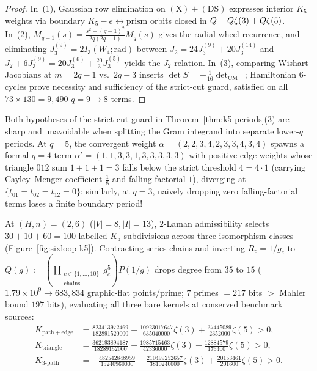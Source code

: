 \begin{proof}
In~(1), Gaussian row elimination on $(\mathrm{X})+(\mathrm{DS})$ expresses interior $K_5$ weights via boundary $K_5-e \leftrightarrow \mathrm{prism}$ orbits closed in $Q+Q\zeta(3)+Q\zeta(5)$. In~(2), $M_{q+1}(s) = \frac{s^2-(q-1)^2}{2q(2q-1)}M_q(s)$ gives the radial-wheel recurrence, and eliminating $J_3^{(9)} = 2I_3(W_4;\mathrm{rad})$ between $J_2 = 24J_3^{(9)} + 20J_3^{(14)}$ and $J_2 + 6J_3^{(9)} = 20J_3^{(6)} + \frac{20}{3}J_3^{(5)}$ yields the $J_2$ relation. In~(3), comparing Wishart Jacobians at $m=2q-1$ vs.\ $2q-3$ inserts $\det S = -\frac{1}{16}\det_{\mathrm{CM}}$~\cite{CSS13}; Hamiltonian $6$-cycles prove necessity and sufficiency of the strict-cut guard, satisfied on all $73\times 130 = 9{,}490$ $q=9\to 8$ terms.
\end{proof}

Both hypotheses of the strict-cut guard in Theorem~\ref{thm:k5-periods}(3) are sharp and unavoidable when splitting the Gram integrand into separate lower-$q$ periods. At $q = 5$, the convergent weight $\alpha = (2,2,3,4,2,3,3,4,3,4)$ spawns a formal $q = 4$ term $\alpha' = (1,1,3,3,1,3,3,3,3,3)$ with positive edge weights whose triangle $012$ sum $1+1+1 = 3$ falls below the strict threshold $4 = 4\cdot 1$ (carrying Cayley--Menger coefficient $\frac{1}{8}$ and falling factorial $1$), diverging at $\{t_{01}=t_{02}=t_{12}=0\}$; similarly, at $q = 3$, naively dropping zero falling-factorial terms loses a finite boundary period!

\begin{theorem}
\label{thm:sixloop-k5}
At $(H,n) = (2,6)$ ($|V|=8, |I|=13$), $2$-Laman admissibility selects $30+10+60 = 100$ labelled $K_5$ subdivisions across three isomorphism classes (Figure~\ref{fig:sixloop-k5}). Contracting series chains and inverting $R_c = 1/g_c$ to $Q(g) := (\prod_{\substack{c\in\{1,\dots,10\}\\\mathrm{chains}}}g_c^5)\overline{P}(1/g)$ drops degree from $35$ to $15$ ($1.79\times 10^9 \to 683{,}834$ graphic-flat points/prime; $7$ primes $= 217$ bits $>$ Mahler bound $197$ bits), evaluating all three bare kernels at conserved benchmark sources:
\begin{equation}
\label{eq:sixloop-k5-values}
\begin{aligned}
K_{\mathrm{path+edge}} &= \frac{823413972469}{182891520000} - \frac{10923017647}{635040000}\zeta(3) + \frac{37445089}{2352000}\zeta(5) > 0,\\
K_{\mathrm{triangle}} &= \frac{362193894187}{18289152000} + \frac{1985715463}{42336000}\zeta(3) - \frac{12884579}{176400}\zeta(5) > 0,\\
K_{3\text{-}\mathrm{path}} &= -\frac{482542848959}{15240960000} - \frac{210499252657}{3810240000}\zeta(3) + \frac{20153461}{201600}\zeta(5) > 0.
\end{aligned}
\end{equation}
\end{theorem}


